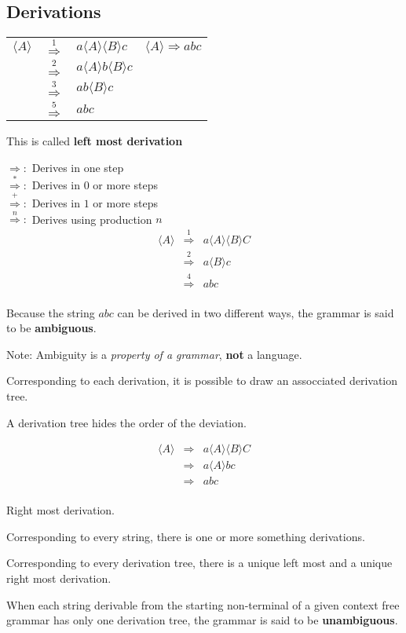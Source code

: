 \documentclass[a4paper,12pt]{article}
\begin{document}
\subsection*{Derivations}

\begin{tabular}{lcl|l}
$\langle A \rangle$	&	$\stackrel{1}{\Rightarrow}$	&	$a \langle A \rangle
\langle B \rangle c$	&	$\langle A \rangle \Rightarrow abc$ \\
							&	$\stackrel{2}{\Rightarrow}$	&	$a \langle A \rangle
b \langle B \rangle c$	&	 \\	
							&	$\stackrel{3}{\Rightarrow}$	&	$a b \langle B \rangle c$	&	 \\
							&	$\stackrel{5}{\Rightarrow}$	&	$a b c $	&	\\
\end{tabular}

This is called \textbf{left most derivation}

$\Rightarrow : $ Derives in one step \\
$\stackrel{*}{\Rightarrow} : $ Derives in $0$ or more steps \\
$\stackrel{+}{\Rightarrow} : $ Derives in $1$ or more steps \\
$\stackrel{n}{\Rightarrow} : $ Derives using production $n$ \\

\begin{eqnarray*}
\langle A \rangle &	\stackrel{1}{\Rightarrow}	&	a \langle A \rangle \langle B \rangle C \\
						&	\stackrel{2}{\Rightarrow}	&	a \langle B \rangle c \\
						&	\stackrel{4}{\Rightarrow}	&	abc	\\
\end{eqnarray*}

Because the string $abc$ can be derived in two different ways, the
grammar is said to be \textbf{ambiguous}.

Note: Ambiguity is a \emph{property of a grammar}, \textbf{not} a
language.

Corresponding to each derivation, it is possible to draw an assocciated
derivation tree.



A derivation tree hides the order of the deviation.

\begin{eqnarray*}
\langle A \rangle &	\Rightarrow	&	a \langle A \rangle \langle B \rangle C \\
						&	\Rightarrow	&	a \langle A \rangle b c \\
						&	\Rightarrow	&	abc	\\
\end{eqnarray*}

Right most derivation.


Corresponding to every string, there is one or more something
derivations.

Corresponding to every derivation tree, there is a unique left most and
a unique right most derivation.

When each string derivable from the starting non-terminal of a given
context free grammar has only one derivation tree, the grammar is said
to be \textbf{unambiguous}.
\end{document}
